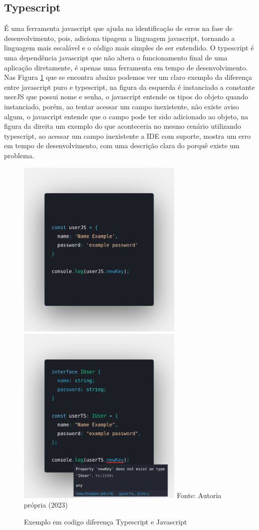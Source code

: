 \documentclass{ufersa}
\begin{document}
\subsection{Typescript}
É uma ferramenta javascript que ajuda na identificação de erros na fase de desenvolvimento, pois,  adiciona tipagem a linguagem javascript, tornando a linguagem mais escalável e o código mais simples de ser entendido. O typescript é uma dependência javascript que não altera o funcionamento final de uma aplicação diretamente, é apenas uma ferramenta em tempo de desenvolvimento. Nas Figura \ref{fig:TypescritXJavascript}  que se encontra abaixo podemos ver um claro exemplo da diferença entre javascript puro e typescript, na figura da esquerda é instanciado a constante userJS que possui nome e senha, o javascript entende os tipos do objeto quando instanciado, porém, ao tentar acessar um campo inexistente, não existe aviso algum, o javascript entende que o campo pode ter sido adicionado ao objeto, na figura da direita um exemplo do que aconteceria no mesmo cenário utilizando typescript, ao acessar um campo inexistente a IDE com suporte, mostra um erro em tempo de desenvolvimento, com uma descrição clara do porquê existe um problema. 

\begin{figure}[h]
\centering
\caption{Exemplo em codigo diferença Typescript e Javascript}
\includegraphics[width=8cm]{assets/codeJS.png} 
\includegraphics[width=8cm]{assets/codeTS.png}
{\footnotesize Fonte: Autoria própria (2023)}
\label{fig:TypescritXJavascript}
\end{figure}
\end{document}

